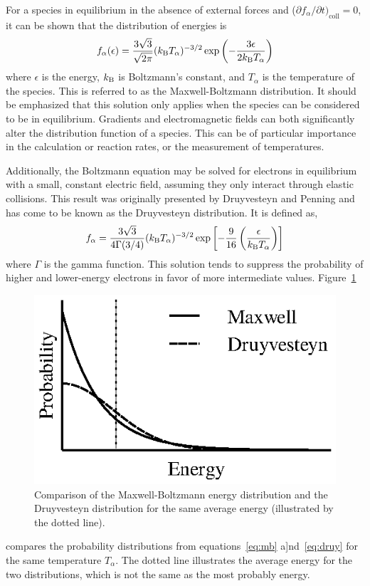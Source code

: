 For a species in equilibrium in the absence of external forces and ($\partial
f_\alpha/\partial t)_\mathrm{coll} = 0$, it can be shown that the distribution
of energies is
\begin{equation}\label{eq:mb}
  f_{\alpha}(\epsilon) = \frac{3\sqrt{3}}{\sqrt{2\pi}}(k_\mathrm{B} T_\alpha)^{-3/2}
                        \exp{\left(-\frac{3\epsilon}{2k_\mathrm{B}T_\alpha}\right)}
\end{equation}
where $\epsilon$ is the energy, $k_\mathrm{B}$ is Boltzmann's constant, and $T_\alpha$ is
the temperature of the species. This is referred to as the Maxwell-Boltzmann
distribution. It should be emphasized that this solution only applies when the
species can be considered to be in equilibrium. Gradients and electromagnetic
fields can both significantly alter the distribution function of a species. This
can be of particular importance in the calculation or reaction rates, or the
measurement of temperatures.

Additionally, the Boltzmann equation may be solved for electrons in equilibrium
with a small, constant electric field, assuming they only interact through
elastic collisions. This result was originally presented by Druyvesteyn and
Penning \cite{Druyvesteyn1940} and has come to be known as the Druyvesteyn
distribution. It is defined as,
\begin{equation}
  f_{\alpha} = \frac{3\sqrt{3}}{4\Gamma(3/4)}(k_\mathrm{B} T_\alpha)^{-3/2}
  \exp{\left[-\frac{9}{16}\left(\frac{\epsilon}{k_\mathrm{B}T_\alpha}\right)\right]}
  \label{eq:druy}
\end{equation}
where $\Gamma$ is the gamma function. This solution tends to suppress the
probability of higher and lower-energy electrons in favor of more intermediate
values. Figure~\ref{fig:simpledists}
\begin{figure}
  \centering
  \includegraphics{./chapters/theory/figures/simpledists.eps}
  \caption{Comparison of the Maxwell-Boltzmann energy distribution and the
    Druyvesteyn distribution for the same average energy (illustrated by the
  dotted line).}
  \label{fig:simpledists}
\end{figure}
compares the probability distributions from equations~\ref{eq:mb}
a]nd~\ref{eq:druy} for the same temperature $T_\alpha$. The dotted line
illustrates the average energy for the two distributions, which is not the same
as the most probably energy.

